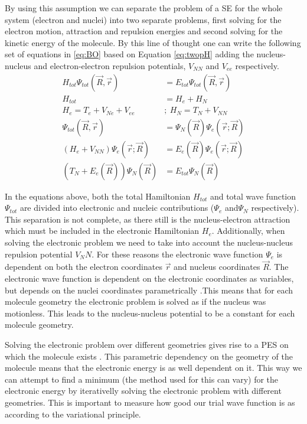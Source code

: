 \documentclass[../master_thesis.tex]{subfiles}
\begin{document}
By using this assumption we can separate the problem of a \ac{SE} for the whole
system (electron and nuclei) into two separate problems, first solving for the
electron motion, attraction and repulsion energies and second solving for the
kinetic energy of the molecule\cite{Cramer:2004}. By this line of thought one
can write the following set of equations in \ref{eq:BO} based on Equation
\ref{eq:twopH} adding the nucleus-nucleus
and electron-electron repulsion potentials, $ V_{NN} $ and $ V_{ee} $
respectively.
\begin{equation}
  \begin{split}\label{eq:BO}
    H_{tot}\Psi_{tot}(\vec{R}, \vec{r}) &= E_{tot}\Psi_{tot}(\vec{R},
    \vec{r})\\
    H_{tot} &= H_e + H_N \\
    H_e = T_e + V_{Ne} + V_{ee} ~&;~ H_N = T_N + V_{NN} \\
    \Psi_{tot}(\vec{R}, \vec{r}) &= \Psi_N(\vec{R})\Psi_e(\vec{r}; \vec{R}) \\
    (H_e + V_{NN})\Psi_e(\vec{r}; \vec{R}) &= E_e(\vec{R})\Psi_e(\vec{r};
    \vec{R})\\
    (T_N + E_e(\vec{R}))\Psi_N(\vec{R}) &= E_{tot}\Psi_N(\vec{R})
  \end{split}
\end{equation}

In the equations above, both the total Hamiltonian $H_{tot}$ and total
wave function $\Psi_{tot}$ are divided into electronic and nucleic contributions
($\Psi_e$ and$\Psi_N$ respectively). This separation is not complete, as there
still is the nucleus-electron attraction which must be included in the
electronic Hamiltonian $H_e$. Additionally, when solving the electronic problem
we need to take into account the nucleus-nucleus repulsion potential $V_NN$.
For these reasons the electronic wave function $\Psi_e$ is dependent on both the
electron coordinates $\vec{r}$ and nucleus coordinates $\vec{R}$. The
electronic wave function is dependent on the electronic coordinates as
variables, but depends on the nuclei coordinates parametrically
\cite{Jensen:2017}.This means that for each molecule geometry the electronic
problem is solved as if the nucleus was motionless. This leads to the
nucleus-nucleus potential to be a constant for each molecule geometry.

Solving the electronic problem over different geometries gives rise to a
\ac{PES} on which the molecule exists \cite{Cramer:2004}. This parametric
dependency on the geometry of the molecule means that the electronic energy is
as well dependent on it. This way we can attempt to find a minimum (the method
used for this can vary) for the electronic energy by iterativelly solving the
electronic problem with different geometries. This is important to measure how
good our trial wave function is as according to the variational principle.
\end{document}
